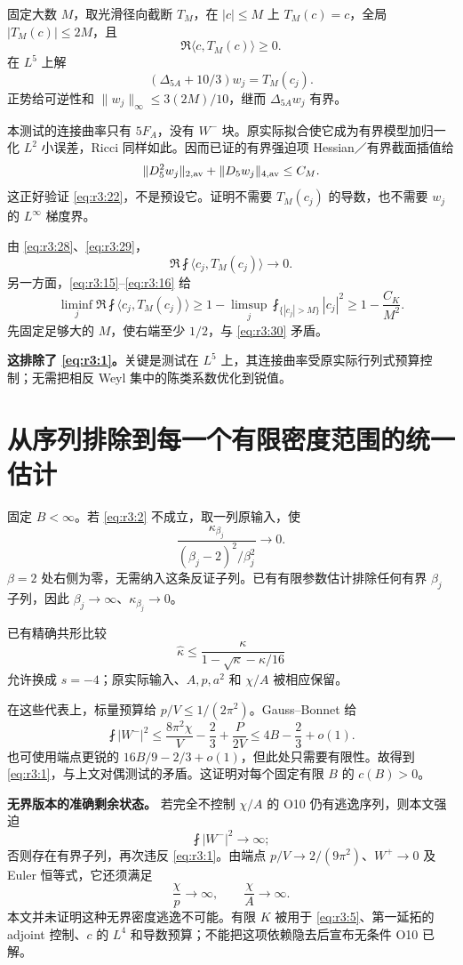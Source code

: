 \documentclass[UTF8,11pt,openany,oneside,fontset=none]{ctexbook}
\begin{document}
固定大数 \(M\)，取光滑径向截断 \(T_M\)，在 \(|c|\le M\) 上 \(T_M(c)=c\)，全局 \(|T_M(c)|\le2M\)，且 \[
 \Re\langle c,T_M(c)\rangle\ge0.
\] 在 \(L^5\) 上解 \[
 \boxed{(\Delta_{5A}+10/3)w_j=T_M(c_j).}
 \tag{3.29}\label{eq:r3:29}
\] 正势给可逆性和 \(\|w_j\|_\infty\le3(2M)/10\)，继而 \(\Delta_{5A}w_j\) 有界。

本测试的连接曲率只有 \(5F_A\)，没有 \(W^-\) 块。原实际拟合使它成为有界模型加归一化 \(L^2\) 小误差，Ricci 同样如此。因而已证的有界强迫项 Hessian／有界截面插值给 \[
 \|D_5^2w_j\|_{2,\rm av}+\|D_5w_j\|_{4,\rm av}\le C_M.
\] 这正好验证 \eqref{eq:r3:22}，不是预设它。证明不需要 \(T_M(c_j)\) 的导数，也不需要 \(w_j\) 的 \(L^\infty\) 梯度界。

由 \eqref{eq:r3:28}、\eqref{eq:r3:29}， \[
 \Re\fint\langle c_j,T_M(c_j)\rangle\longrightarrow0.
 \tag{3.30}\label{eq:r3:30}
\] 另一方面，\eqref{eq:r3:15}--\eqref{eq:r3:16} 给 \[
 \liminf_j\Re\fint\langle c_j,T_M(c_j)\rangle
 \ge 1-\limsup_j\fint_{\{|c_j|>M\}}|c_j|^2
 \ge1-\frac{C_K}{M^2}.
 \tag{3.31}\label{eq:r3:31}
\] 先固定足够大的 \(M\)，使右端至少 \(1/2\)，与 \eqref{eq:r3:30} 矛盾。

\textbf{这排除了 \eqref{eq:r3:1}。}关键是测试在 \(L^5\) 上，其连接曲率受原实际行列式预算控制；无需把相反 Weyl 集中的陈类系数优化到锐值。

\section{从序列排除到每一个有限密度范围的统一估计}\label{ch3:ux4eceux5e8fux5217ux6392ux9664ux5230ux6bcfux4e00ux4e2aux6709ux9650ux5bc6ux5ea6ux8303ux56f4ux7684ux7edfux4e00ux4f30ux8ba1}

固定 \(B<\infty\)。若 \eqref{eq:r3:2} 不成立，取一列原输入，使 \[
 \frac{\kappa_{\beta_j}}{(\beta_j-2)^2/\beta_j^2}\to0.
\] \(\beta=2\) 处右侧为零，无需纳入这条反证子列。已有有限参数估计排除任何有界 \(\beta_j\) 子列，因此 \(\beta_j\to\infty\)、\(\kappa_{\beta_j}\to0\)。

已有精确共形比较 \[
 \widehat\kappa\le
 \frac{\kappa}{1-\sqrt\kappa-\kappa/16}
\] 允许换成 \(s=-4\)；原实际输入、\(A,p,a^2\) 和 \(\chi/A\) 被相应保留。

在这些代表上，标量预算给 \(p/V\le1/(2\pi^2)\)。Gauss--Bonnet 给 \[
 \fint|W^-|^2
 \le \frac{8\pi^2\chi}{V}-\frac23+\frac{P}{2V}
 \le4B-\frac23+o(1).
\] 也可使用端点更锐的 \(16B/9-2/3+o(1)\)，但此处只需要有限性。故得到 \eqref{eq:r3:1}，与上文对偶测试的矛盾。这证明对每个固定有限 \(B\) 的 \(c(B)>0\)。

\textbf{无界版本的准确剩余状态。} 若完全不控制 \(\chi/A\) 的 O10 仍有逃逸序列，则本文强迫 \[
 \fint|W^-|^2\longrightarrow\infty;
\] 否则存在有界子列，再次违反 \eqref{eq:r3:1}。由端点 \(p/V\to2/(9\pi^2)\)、\(W^+\to0\) 及 Euler 恒等式，它还须满足 \[
 \frac\chi p\longrightarrow\infty,
 \qquad \frac\chi A\longrightarrow\infty.
\] 本文并未证明这种无界密度逃逸不可能。有限 \(K\) 被用于 \eqref{eq:r3:5}、第一延拓的 adjoint 控制、\(c\) 的 \(L^4\) 和导数预算；不能把这项依赖隐去后宣布无条件 O10 已解。
\end{document}
